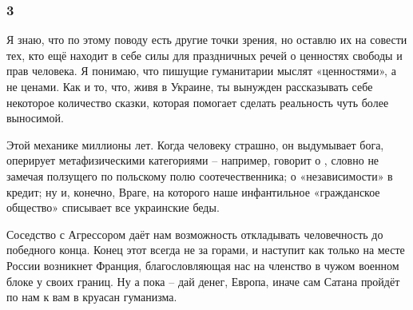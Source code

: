  
 
 
 
 
\subsubsection{3}
\label{sec:22_11_2021.fb.uljanov_anatolij.1.maidan.3}

Я знаю, что по этому поводу есть другие точки зрения, но оставлю их на совести
тех, кто ещё находит в себе силы для праздничных речей о ценностях свободы и
прав человека. Я понимаю, что пишущие гуманитарии мыслят «ценностями», а не
ценами. Как и то, что, живя в Украине, ты вынужден рассказывать себе некоторое
количество сказки, которая помогает сделать реальность чуть более выносимой. 

Этой механике миллионы лет. Когда человеку страшно, он выдумывает бога,
оперирует метафизическими категориями – например, говорит о , словно не замечая ползущего по польскому полю соотечественника; о
«независимости» в кредит; ну и, конечно, Враге, на которого наше инфантильное
«гражданское общество» списывает все украинские беды.

Соседство с Агрессором даёт нам возможность откладывать человечность до
победного конца. Конец этот всегда не за горами, и наступит как только на месте
России возникнет Франция, благословляющая нас на членство в чужом военном блоке
у своих границ. Ну а пока – дай денег, Европа, иначе сам Сатана пройдёт по нам
к вам в круасан гуманизма.
